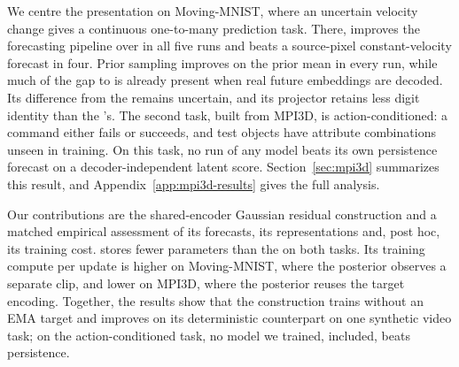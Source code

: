 We centre the presentation on Moving-MNIST, where an uncertain velocity change gives a continuous one-to-many prediction task. There, \shvar{} improves the forecasting pipeline over \shdet{} in all five runs and beats a source-pixel constant-velocity forecast in four. Prior sampling improves on the prior mean in every run, while much of the gap to \shdet{} is already present when real future embeddings are decoded. Its difference from the \emavar{} remains uncertain, and its projector retains less digit identity than the \emavar{}'s. The second task, built from MPI3D, is action-conditioned: a command either fails or succeeds, and test objects have attribute combinations unseen in training. On this task, no run of any model beats its own persistence forecast on a decoder-independent latent score. Section~\ref{sec:mpi3d} summarizes this result, and Appendix~\ref{app:mpi3d-results} gives the full analysis.

Our contributions are the shared-encoder Gaussian residual construction and a matched empirical assessment of its forecasts, its representations and, post hoc, its training cost. \shvar{} stores fewer parameters than the \emavar{} on both tasks. Its training compute per update is higher on Moving-MNIST, where the posterior observes a separate clip, and lower on MPI3D, where the posterior reuses the target encoding. Together, the results show that the construction trains without an EMA target and improves on its deterministic counterpart on one synthetic video task; on the action-conditioned task, no model we trained, \shvar{} included, beats persistence.
